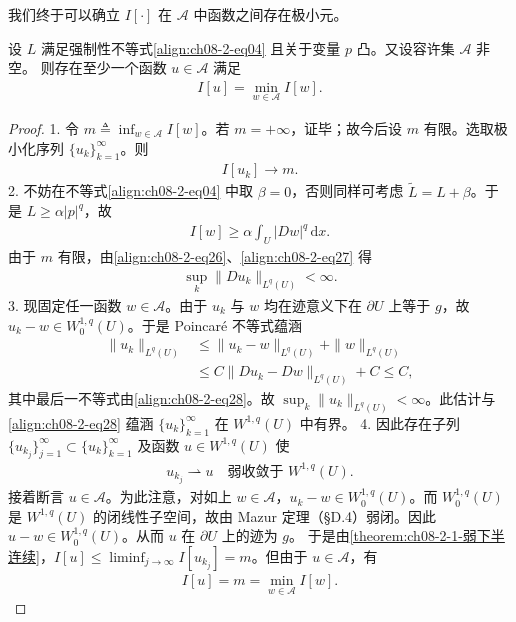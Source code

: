 \documentclass[../../main.tex]{subfiles}
\begin{document}
我们终于可以确立 $I[\cdot]$ 在 $\mathcal{A}$ 中函数之间存在极小元。

\begin{theorem}[极小元的存在性]\label{theorem:ch06-2-2-存在唯一性}
设 $L$ 满足强制性不等式\eqref{align:ch08-2-eq04} 且关于变量 $p$ 凸。又设容许集 $\mathcal{A}$ 非空。
则存在至少一个函数 $u\in\mathcal{A}$ 满足
\begin{align*}
I[u]=\min_{w\in\mathcal{A}}I[w].
\end{align*}
\begin{proof}
1. 令 $m\triangleq\inf_{w\in\mathcal{A}}I[w]$。若 $m=+\infty$，证毕；故今后设 $m$ 有限。选取极小化序列 $\{u_k\}_{k=1}^\infty$。则
\begin{align}
I[u_k]\to m.\label{align:ch08-2-eq26}
\end{align}
2. 不妨在不等式\eqref{align:ch08-2-eq04} 中取 $\beta=0$，否则同样可考虑 $\widetilde{L}=L+\beta$。于是 $L\geqslant\alpha|p|^q$，故
\begin{align}
I[w]\geqslant\alpha\int_U|Dw|^q\,\mathrm{d}x.\label{align:ch08-2-eq27}
\end{align}
由于 $m$ 有限，由\eqref{align:ch08-2-eq26}、\eqref{align:ch08-2-eq27} 得
\begin{align}
\sup_k\|Du_k\|_{L^q(U)}<\infty.\label{align:ch08-2-eq28}
\end{align}
3. 现固定任一函数 $w\in\mathcal{A}$。由于 $u_k$ 与 $w$ 均在迹意义下在 $\partial U$ 上等于 $g$，故 $u_k-w\in W_0^{1,q}(U)$。于是 Poincaré 不等式蕴涵
\begin{align*}
\|u_k\|_{L^q(U)}&\leqslant\|u_k-w\|_{L^q(U)}+\|w\|_{L^q(U)}\\
&\leqslant C\|Du_k-Dw\|_{L^q(U)}+C\leqslant C,
\end{align*}
其中最后一不等式由\eqref{align:ch08-2-eq28}。故 $\sup_k\|u_k\|_{L^q(U)}<\infty$。此估计与\eqref{align:ch08-2-eq28} 蕴涵 $\{u_k\}_{k=1}^\infty$ 在 $W^{1,q}(U)$ 中有界。
4. 因此存在子列 $\{u_{k_j}\}_{j=1}^\infty\subset\{u_k\}_{k=1}^\infty$ 及函数 $u\in W^{1,q}(U)$ 使
\begin{align*}
u_{k_j}\rightharpoonup u\quad\text{弱收敛于 }W^{1,q}(U).
\end{align*}
接着断言 $u\in\mathcal{A}$。为此注意，对如上 $w\in\mathcal{A}$，$u_k-w\in W_0^{1,q}(U)$。而 $W_0^{1,q}(U)$ 是 $W^{1,q}(U)$ 的闭线性子空间，故由 Mazur 定理（\S D.4）弱闭。因此 $u-w\in W_0^{1,q}(U)$。从而 $u$ 在 $\partial U$ 上的迹为 $g$。
于是由\cref{theorem:ch08-2-1-弱下半连续}，$I[u]\leqslant\liminf_{j\to\infty}I[u_{k_j}]=m$。但由于 $u\in\mathcal{A}$，有
\begin{align*}
I[u]=m=\min_{w\in\mathcal{A}}I[w].
\end{align*}
\end{proof}
\end{theorem}
\end{document}
